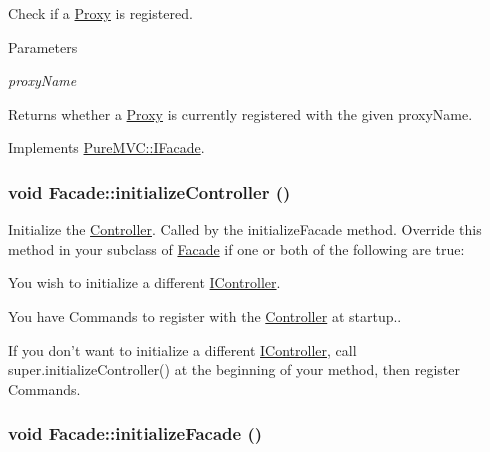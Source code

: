 Check if a \hyperlink{class_pure_m_v_c_1_1_proxy}{Proxy} is registered. 
\begin{DoxyParams}{Parameters}
\item[{\em proxyName}]\end{DoxyParams}
\begin{DoxyReturn}{Returns}
whether a \hyperlink{class_pure_m_v_c_1_1_proxy}{Proxy} is currently registered with the given {\ttfamily proxyName}. 
\end{DoxyReturn}


Implements \hyperlink{class_pure_m_v_c_1_1_i_facade_a61b5a6f7c6d25c791b274093235f5c52}{PureMVC::IFacade}.\hypertarget{class_pure_m_v_c_1_1_facade_a90a6aaf2e117d6be41977192c5d169fc}{
\subsubsection[{initializeController}]{\setlength{\rightskip}{0pt plus 5cm}void Facade::initializeController ()}}
\label{class_pure_m_v_c_1_1_facade_a90a6aaf2e117d6be41977192c5d169fc}


Initialize the {\ttfamily \hyperlink{class_pure_m_v_c_1_1_controller}{Controller}}. Called by the {\ttfamily initializeFacade} method. Override this method in your subclass of {\ttfamily \hyperlink{class_pure_m_v_c_1_1_facade}{Facade}} if one or both of the following are true: 
\begin{DoxyItemize}
\item You wish to initialize a different {\ttfamily \hyperlink{class_pure_m_v_c_1_1_i_controller}{IController}}. 
\item You have {\ttfamily Commands} to register with the {\ttfamily \hyperlink{class_pure_m_v_c_1_1_controller}{Controller}} at startup..  
\end{DoxyItemize}If you don't want to initialize a different {\ttfamily \hyperlink{class_pure_m_v_c_1_1_i_controller}{IController}}, call {\ttfamily super.initializeController()} at the beginning of your method, then register {\ttfamily Command}s.  \hypertarget{class_pure_m_v_c_1_1_facade_a9b3baa74217ad2b58a66b36f46c899f3}{
\subsubsection[{initializeFacade}]{\setlength{\rightskip}{0pt plus 5cm}void Facade::initializeFacade ()}}
\label{class_pure_m_v_c_1_1_facade_a9b3baa74217ad2b58a66b36f46c899f3}


